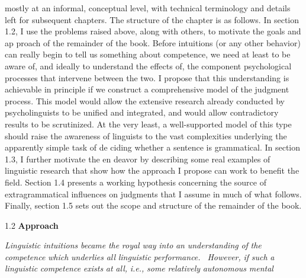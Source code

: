 \clearpage\setcounter{page}{1}\begin{styleTextbody}
mostly at an informal, conceptual level, with technical terminology and details left for subsequent chapters. The structure of the chapter is as follows. In section 1.2, I use the problems raised above, along with others, to motivate the goals and ap\- proach of the remainder of the book. Before intuitions (or any other behavior) can really begin to tell us something about competence, we need at least to be aware of, and ideally to understand the effects of, the component psychological processes that intervene between the two. I propose that this understanding is achievable in principle if we construct a comprehensive model of the judgment process. This model would allow the extensive research already conducted by psycholinguists to be unified and integrated, and would allow contradictory results to be scrutinized. At the very least, a well-supported model of this type should raise the awareness of linguists to the vast complexities underlying the apparently simple task of de\- ciding whether a sentence is grammatical. In section 1.3, I further motivate the en\- deavor by describing some real examples of linguistic research that show how the approach I propose can work to benefit the field. Section 1.4 presents a working hypothesis concerning the source of extragrammatical influences on judgments that I assume in much of what follows. Finally, section 1.5 sets out the scope and structure of the remainder of the book.
\end{styleTextbody}


\begin{styleStandard}
1.2 \textbf{Approach}
\end{styleStandard}


\begin{styleStandard}
\textit{Linguistic}\textit{ }\textit{intuitions}\textit{ }\textit{became}\textit{ }\textit{the}\textit{ }\textit{royal}\textit{ }\textit{way}\textit{ }\textit{into}\textit{ }\textit{an}\textit{ }\textit{understanding}\textit{ }\textit{of}\textit{ }\textit{the}\textit{ }\textit{competence}\textit{ }\textit{which}\textit{ }\textit{underlies}\textit{ }\textit{all}\textit{ }\textit{linguistic}\textit{ }\textit{performance. }\textit{\ }\textit{However,}\textit{ }\textit{if}\textit{ }\textit{such}\textit{ }\textit{a linguistic}\textit{ }\textit{competence}\textit{ }\textit{exists}\textit{ }\textit{at}\textit{ }\textit{all,}\textit{ }\textit{i.e.,}\textit{ }\textit{some}\textit{ }\textit{relatively}\textit{ }\textit{autonomous}\textit{ }\textit{mental}
\end{styleStandard}


